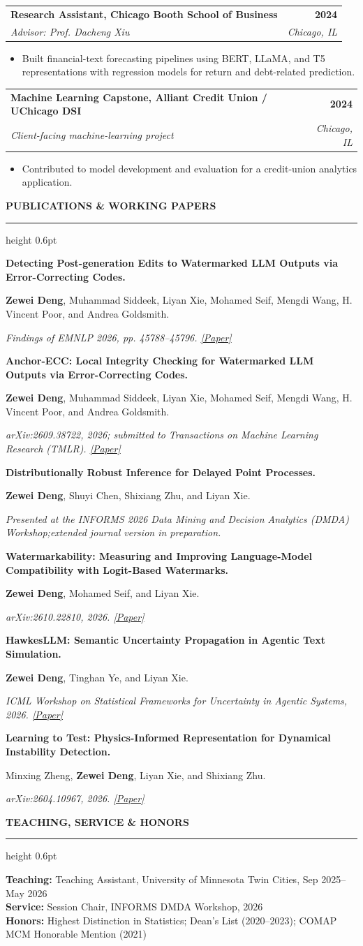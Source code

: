 \documentclass[10pt,letterpaper]{article}
\makeatletter
\newcommand{\cvsection}[1]{%
  \vspace{4.5pt}
  {\color{umnmaroon}\bfseries\normalsize #1}\par
  \vspace{1.2pt}
  {\color{rulegray}\hrule height 0.6pt}
  \vspace{2.5pt}
}
\newcommand{\entry}[4]{%
  \begin{tabularx}{\textwidth}{@{}Xr@{}}
    \textbf{#1} & \textbf{#2}\\[-1pt]
    \textit{#3} & {\color{muted}\textit{#4}}
  \end{tabularx}
}
\newcommand{\publication}[3]{%
  \textbf{#1}\par
  #2\par
  {\color{muted}\textit{#3}}\par\vspace{4.5pt}
}
\makeatother
\begin{document}
\vspace{1pt}
\entry{Research Assistant, Chicago Booth School of Business}{2024}{Advisor: Prof. Dacheng Xiu}{Chicago, IL}
\begin{itemize}
  \item Built financial-text forecasting pipelines using BERT, LLaMA, and T5 representations with regression models for return and debt-related prediction.
\end{itemize}

\vspace{1pt}
\entry{Machine Learning Capstone, Alliant Credit Union / UChicago DSI}{2024}{Client-facing machine-learning project}{Chicago, IL}
\begin{itemize}
  \item Contributed to model development and evaluation for a credit-union analytics application.
\end{itemize}

\cvsection{PUBLICATIONS \& WORKING PAPERS}
\publication
  {Detecting Post-generation Edits to Watermarked LLM Outputs via Error-Correcting Codes.}
  {\textbf{Zewei Deng}, Muhammad Siddeek, Liyan Xie, Mohamed Seif, Mengdi Wang, H. Vincent Poor, and Andrea Goldsmith.}
  {Findings of EMNLP 2026, pp. 45788--45796. \href{https://aclanthology.org/2026.findings-emnlp.2142/}{[Paper]}}
\publication
  {Anchor-ECC: Local Integrity Checking for Watermarked LLM Outputs via Error-Correcting Codes.}
  {\textbf{Zewei Deng}, Muhammad Siddeek, Liyan Xie, Mohamed Seif, Mengdi Wang, H. Vincent Poor, and Andrea Goldsmith.}
  {arXiv:2609.38722, 2026; submitted to Transactions on Machine Learning Research (TMLR). \href{https://arxiv.org/abs/2609.38722}{[Paper]}}
\publication
  {Distributionally Robust Inference for Delayed Point Processes.}
  {\textbf{Zewei Deng}, Shuyi Chen, Shixiang Zhu, and Liyan Xie.}
  {Presented at the INFORMS 2026 Data Mining and Decision Analytics (DMDA) Workshop;\newline extended journal version in preparation.}
\publication
  {Watermarkability: Measuring and Improving Language-Model Compatibility with Logit-Based Watermarks.}
  {\textbf{Zewei Deng}, Mohamed Seif, and Liyan Xie.}
  {arXiv:2610.22810, 2026. \href{https://arxiv.org/abs/2610.22810}{[Paper]}}
\publication
  {HawkesLLM: Semantic Uncertainty Propagation in Agentic Text Simulation.}
  {\textbf{Zewei Deng}, Tinghan Ye, and Liyan Xie.}
  {ICML Workshop on Statistical Frameworks for Uncertainty in Agentic Systems, 2026. \href{https://arxiv.org/abs/2605.23043}{[Paper]}}
\publication
  {Learning to Test: Physics-Informed Representation for Dynamical Instability Detection.}
  {Minxing Zheng, \textbf{Zewei Deng}, Liyan Xie, and Shixiang Zhu.}
  {arXiv:2604.10967, 2026. \href{https://arxiv.org/abs/2604.10967}{[Paper]}}

\cvsection{TEACHING, SERVICE \& HONORS}
\textbf{Teaching:} Teaching Assistant, University of Minnesota Twin Cities, Sep 2025--May 2026\\[1.5pt]
\textbf{Service:} Session Chair, INFORMS DMDA Workshop, 2026\\[1.5pt]
\textbf{Honors:} Highest Distinction in Statistics; Dean's List (2020--2023); COMAP MCM Honorable Mention (2021)
\end{document}
